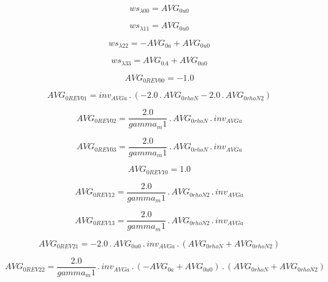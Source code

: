 \documentclass{article}
\begin{document}
\begin{dmath}ws_{\lambda 00} = AVG_{0 u0}\end{dmath}

\begin{dmath}ws_{\lambda 11} = AVG_{0 u0}\end{dmath}

\begin{dmath}ws_{\lambda 22} = - AVG_{0 a} + AVG_{0 u0}\end{dmath}

\begin{dmath}ws_{\lambda 33} = AVG_{0 A} + AVG_{0 u0}\end{dmath}

\begin{dmath}AVG_{0 REV 00} = -1.0\end{dmath}

\begin{dmath}AVG_{0 REV 01} = inv_{AVG a} \,.\, \left(- 2.0 \,.\, AVG_{0 rhoN} - 2.0 \,.\, AVG_{0 rhoN2}\right)\end{dmath}

\begin{dmath}AVG_{0 REV 02} = \frac{2.0}{gamma_m1} \,.\, AVG_{0 rhoN} \,.\, inv_{AVG a}\end{dmath}

\begin{dmath}AVG_{0 REV 03} = \frac{2.0}{gamma_m1} \,.\, AVG_{0 rhoN} \,.\, inv_{AVG a}\end{dmath}

\begin{dmath}AVG_{0 REV 10} = 1.0\end{dmath}

\begin{dmath}AVG_{0 REV 12} = \frac{2.0}{gamma_m1} \,.\, AVG_{0 rhoN2} \,.\, inv_{AVG a}\end{dmath}

\begin{dmath}AVG_{0 REV 13} = \frac{2.0}{gamma_m1} \,.\, AVG_{0 rhoN2} \,.\, inv_{AVG a}\end{dmath}

\begin{dmath}AVG_{0 REV 21} = - 2.0 \,.\, AVG_{0 u0} \,.\, inv_{AVG a} \,.\, \left(AVG_{0 rhoN} + AVG_{0 rhoN2}\right)\end{dmath}

\begin{dmath}AVG_{0 REV 22} = \frac{2.0}{gamma_m1} \,.\, inv_{AVG a} \,.\, \left(- AVG_{0 a} + AVG_{0 u0}\right) \,.\, \left(AVG_{0 rhoN} + AVG_{0 rhoN2}\right)\end{dmath}
\end{document}
